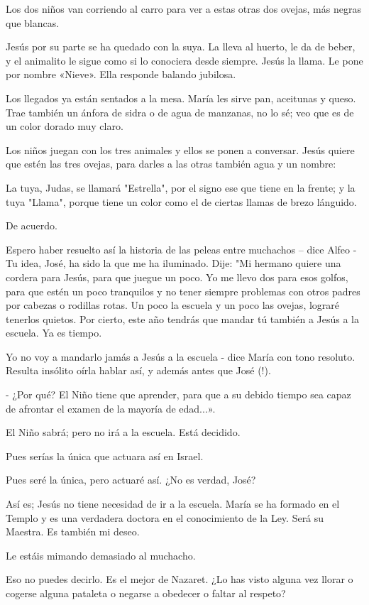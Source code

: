 \documentclass[12pt, twoside, openright]{book} %
\begin{document}
Los dos niños van corriendo al carro para ver a estas otras dos ovejas, más negras que blancas. 

Jesús por su parte se ha quedado con la suya. La lleva al huerto, le da de beber, y el animalito le sigue como si lo conociera desde siempre. Jesús la llama. Le pone por nombre «Nieve». Ella responde balando jubilosa. 

Los llegados ya están sentados a la mesa. María les sirve pan, aceitunas y queso. Trae también un ánfora de sidra o de agua de manzanas, no lo sé; veo que es de un color dorado muy claro. 

Los niños juegan con los tres animales y ellos se ponen a conversar. Jesús quiere que estén las tres ovejas, para darles a las otras también agua y un nombre: 

La tuya, Judas, se llamará "Estrella", por el signo ese que tiene en la frente; y la tuya "Llama", porque tiene un color como el de ciertas llamas de brezo lánguido. 

De acuerdo. 

Espero haber resuelto así la historia de las peleas entre muchachos – dice Alfeo - Tu idea, José, ha sido la que me ha iluminado. Dije: "Mi hermano quiere una cordera para Jesús, para que juegue un poco. Yo me llevo dos para esos golfos, para que estén un poco tranquilos y no tener siempre problemas con otros padres por cabezas o rodillas rotas. Un poco la escuela y un poco las ovejas, lograré tenerlos quietos. Por cierto, este año tendrás que mandar tú también a Jesús a la escuela. Ya es tiempo. 

Yo no voy a mandarlo jamás a Jesús a la escuela - dice María con tono resoluto. Resulta insólito oírla hablar así, y además antes que José (!). 

- ¿Por qué? El Niño tiene que aprender, para que a su debido tiempo sea capaz de afrontar el examen de la mayoría de edad...». 

El Niño sabrá; pero no irá a la escuela. Está decidido. 

Pues serías la única que actuara así en Israel. 

Pues seré la única, pero actuaré así. ¿No es verdad, José? 

Así es; Jesús no tiene necesidad de ir a la escuela. María se ha formado en el Templo y es una verdadera doctora en el conocimiento de la Ley. Será su Maestra. Es también mi deseo. 

Le estáis mimando demasiado al muchacho. 

Eso no puedes decirlo. Es el mejor de Nazaret. ¿Lo has visto alguna vez llorar o cogerse alguna pataleta o negarse a obedecer o faltar al respeto? 
\end{document}
